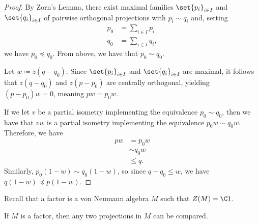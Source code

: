 \documentclass[10pt]{mypackage}
\renewcommand{\coloneq}{\coloneqq}
\begin{document}
\begin{proof}
  By Zorn's Lemma, there exist maximal families $\set{p_i}_{i\in I}$ and $\set{q_i}_{i\in I}$ of pairwise orthogonal projections with $p_i\sim q_i$ and, setting
  \begin{align*}
    p_0 &= \sum_{i\in I}p_i\\
    q_0 &= \sum_{i\in I}q_i,
  \end{align*}
  we have $p_0\preceq q_0$. From above, we have that $p_0\sim q_0$.

  Let $w \coloneq z\left( q-q_0 \right)$. Since $\set{p_i}_{i\in I}$ and $\set{q_i}_{i\in I}$ are maximal, it follows that $z\left( q-q_0 \right)$ and $z\left( p-p_0 \right)$ are centrally orthogonal, yielding $\left( p-p_0 \right)w = 0$, meaning $pw = p_0 w$.

  If we let $v$ be a partial isometry implementing the equivalence $p_0\sim q_0$, then we have that $vw$ is a partial isometry implementing the equivalence $p_0w\sim q_0 w$. Therefore, we have
  \begin{align*}
    pw &= p_0 w\\
       &\sim q_0 w\\
       &\leq  q.
  \end{align*}
  Similarly, $p_0\left( 1-w \right)\sim q_0\left( 1-w \right)$, so since $q-q_0 \leq w$, we have $q\left( 1-w \right)\preceq p\left( 1-w \right)$.
\end{proof}
Recall that a factor is a von Neumann algebra $M$ such that $Z(M) = \C 1$.
\begin{corollary}
  If $M$ is a factor, then any two projections in $M$ can be compared.
\end{corollary}
\end{document}
